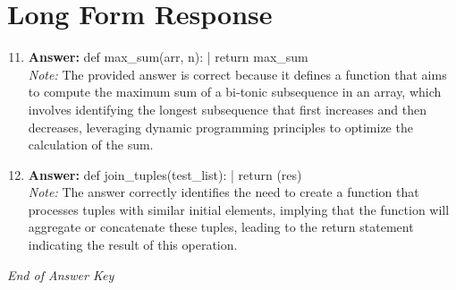 \documentclass[12pt]{article}
\begin{document}
\section*{Long Form Response}
\begin{enumerate}[label=\arabic*.]
\setcounter{enumi}{10}
\item \textbf{Answer:} def max\_sum(arr, n): | return max\_sum
\\ \textit{Note:} The provided answer is correct because it defines a function that aims to compute the maximum sum of a bi-tonic subsequence in an array, which involves identifying the longest subsequence that first increases and then decreases, leveraging dynamic programming principles to optimize the calculation of the sum.
\item \textbf{Answer:} def join\_tuples(test\_list): | return (res)
\\ \textit{Note:} The answer correctly identifies the need to create a function that processes tuples with similar initial elements, implying that the function will aggregate or concatenate these tuples, leading to the return statement indicating the result of this operation.
\end{enumerate}

\vfill
\noindent\textit{End of Answer Key}
\end{document}
